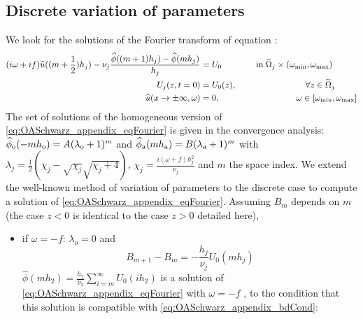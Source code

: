 \begin{appendix}
\section{Discrete variation of parameters}
	\label{sec:OASchwarz_appendix_discreteVariationParameters}
We look for the solutions of the Fourier transform of equation
\label{eq:OASchwarz_DiscreteStationaryState_homogeneousEq1}:
\begin{subequations}
	\begin{align}
	(i\omega + if) \widehat{u}((m+\frac{1}{2}) h_j) -
		\nu_j \frac{\widehat{\phi}((m+1)h_j) -
		\widehat{\phi}(m h_j)}{h_j}
		&=U_0
	\hspace{1.4cm} \mbox{in}\;\widetilde{\Omega}_j \times
	(\omega_{\min},\omega_{\max})
		\label{eq:OASchwarz_appendix_eqFourier}\\
		U_j(z,t=0) &= U_0(z),   \hspace{2.8cm}
		\forall z \in \widetilde{\Omega}_j  \\
		\widehat{u}(x\rightarrow \pm \infty, \omega) &= 0,
		\hspace{3.1cm}
		\omega \in [\omega_{\min},\omega_{\max}]
		\label{eq:OASchwarz_appendix_bdCond}
		\end{align}
		\end{subequations}
The set of solutions of the homogeneous version of
\eqref{eq:OASchwarz_appendix_eqFourier} is given in the
convergence analysis: $\widehat{\phi}_{\rm o}(-m h_{\rm o})
	= A (\lambda_{\rm o}+1)^m$
and
$\widehat{\phi}_{\rm a}(m h_{\rm a}) = B (\lambda_{\rm a}+1)^m$ 
with $\lambda_j = \frac{1}{2}\left(\chi_j - \sqrt{\chi_j} \sqrt{\chi_j + 4}\right)$, 
$\chi_j=\frac{i (\omega+f) h_j^2}{\nu_j}$ and $m$ the space index.
We extend the well-known method of variation of parameters to the
discrete case to compute a solution of
\eqref{eq:OASchwarz_appendix_eqFourier}. 
Assuming $B_m$ depends on $m$ (the case $z<0$ is identical
to the case $z>0$ detailed here),
\begin{itemize}
\item if $\omega=-f$: $\lambda_o=0$ and
	\begin{equation}
		B_{m+1} - B_m = -\frac{h_j}{\nu_j} U_0(m h_j)
	\end{equation}
		$\widehat{\phi}(m h_2)= \frac{h_2}{\nu_2}
		\sum_{i=m}^{\infty} U_0(i h_2)$ is a solution of
		\eqref{eq:OASchwarz_appendix_eqFourier}
		with $\omega=-f$ ,
		to the condition that this solution is compatible
		with \eqref{eq:OASchwarz_appendix_bdCond}:

\end{itemize}
\end{appendix}
